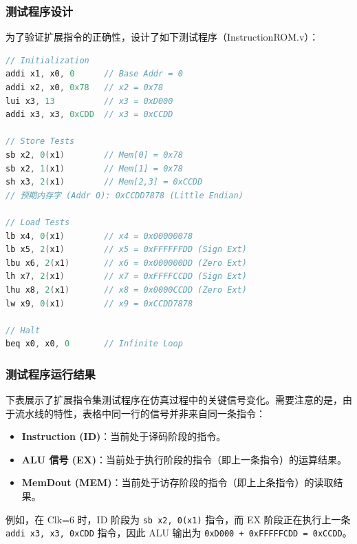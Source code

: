 \documentclass[12pt,a4paper]{article}
\begin{document}
\subsubsection{测试程序设计}

为了验证扩展指令的正确性，设计了如下测试程序（InstructionROM.v）：

\begin{lstlisting}[language=verilog]
// Initialization
addi x1, x0, 0      // Base Addr = 0
addi x2, x0, 0x78   // x2 = 0x78
lui x3, 13          // x3 = 0xD000
addi x3, x3, 0xCDD  // x3 = 0xCCDD

// Store Tests
sb x2, 0(x1)        // Mem[0] = 0x78
sb x2, 1(x1)        // Mem[1] = 0x78
sh x3, 2(x1)        // Mem[2,3] = 0xCCDD
// 预期内存字 (Addr 0): 0xCCDD7878 (Little Endian)

// Load Tests
lb x4, 0(x1)        // x4 = 0x00000078
lb x5, 2(x1)        // x5 = 0xFFFFFFDD (Sign Ext)
lbu x6, 2(x1)       // x6 = 0x000000DD (Zero Ext)
lh x7, 2(x1)        // x7 = 0xFFFFCCDD (Sign Ext)
lhu x8, 2(x1)       // x8 = 0x0000CCDD (Zero Ext)
lw x9, 0(x1)        // x9 = 0xCCDD7878

// Halt
beq x0, x0, 0       // Infinite Loop
\end{lstlisting}

\subsubsection{测试程序运行结果}

下表展示了扩展指令集测试程序在仿真过程中的关键信号变化。需要注意的是，由于流水线的特性，表格中同一行的信号并非来自同一条指令：
\begin{itemize}
    \item \textbf{Instruction (ID)}：当前处于译码阶段的指令。
    \item \textbf{ALU 信号 (EX)}：当前处于执行阶段的指令（即上一条指令）的运算结果。
    \item \textbf{MemDout (MEM)}：当前处于访存阶段的指令（即上上条指令）的读取结果。
\end{itemize}

例如，在 Clk=6 时，ID 阶段为 \texttt{sb x2, 0(x1)} 指令，而 EX 阶段正在执行上一条 \texttt{addi x3, x3, 0xCDD} 指令，因此 ALU 输出为 \texttt{0xD000 + 0xFFFFFCDD = 0xCCDD}。
\end{document}
